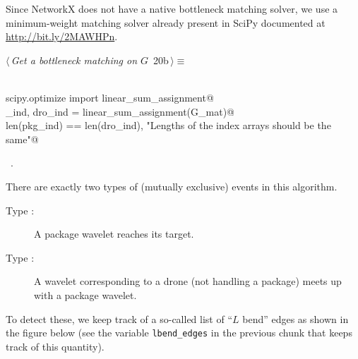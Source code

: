 \documentclass[10pt, english, oneside]{report}
\begin{document}
Since NetworkX does not have a native bottleneck matching solver, we use a minimum-weight matching solver
already present in SciPy documented at \url{http://bit.ly/2MAWHPn}. 

\begin{flushleft} \small
\begin{minipage}{\linewidth}\label{scrap20}\raggedright\small
{} $\langle\,${\itshape Get a bottleneck matching on $G$}\nobreak\ {\footnotesize {20b}}$\,\rangle\equiv$
\vspace{-1ex}
\begin{list}{}{} \item
\mbox{}\verb@@\\
\mbox{}\verb@from scipy.optimize import linear_sum_assignment@\\
\mbox{}\verb@pkg_ind, dro_ind = linear_sum_assignment(G_mat)@\\
\mbox{}\verb@assert len(pkg_ind) == len(dro_ind), "Lengths of the index arrays should be the same"@\\
\mbox{}\verb@@{\NWsep}
\end{list}
\vspace{-1.5ex}
\footnotesize
\begin{list}{}{\setlength{\itemsep}{-\parsep}\setlength{\itemindent}{-\leftmargin}}
\item \NWtxtMacroRefIn\ .

\item{}
\end{list}
\end{minipage}\vspace{4ex}
\end{flushleft}

There are exactly two types of (mutually exclusive) events in this algorithm. 

\begin{description}
\item[Type :] A package wavelet reaches its target. 
\item[Type :] A wavelet corresponding to a drone (not handling a package) 
                      meets up with a package wavelet.
\end{description}

To detect these, we keep track of a so-called list of ``$L$ bend'' edges as shown in the figure below 
(see the variable \verb|lbend_edges| in the previous chunk that keeps track of this quantity).  
\end{document}
